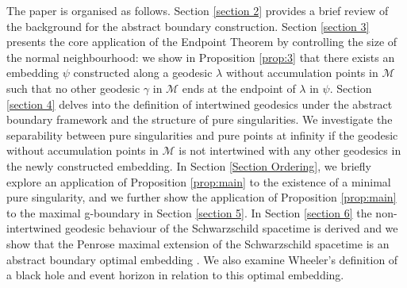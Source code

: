 \documentclass[pdflatex,sn-mathphys-num]{sn-jnl}
\newcommand{\Junbang}[1]{{\color{magenta}#1}}
\theoremstyle{definition}
\begin{document}
The paper is organised as follows. Section \ref{section 2} provides a brief review of the background for the abstract boundary construction. Section \ref{section 3} presents the core application of the Endpoint Theorem by controlling the size of the normal neighbourhood: we show in Proposition \ref{prop:3} that there exists an embedding $\psi$ constructed along a geodesic $\lambda$ without accumulation points in $\mathcal{M}$ such that no other geodesic $\gamma$ in $\mathcal{M}$ ends at the endpoint of $\lambda$ in $\psi$. Section \ref{section 4} delves into the definition of intertwined geodesics under the abstract boundary framework and the structure of pure singularities. We investigate the separability between pure singularities and pure points at infinity if the geodesic without accumulation points in $\mathcal{M}$ is not intertwined with any other geodesics in the newly constructed embedding. In Section \ref{Section Ordering}, we briefly explore an application of Proposition \ref{prop:main} to the existence of a minimal pure singularity, and we further show the application of Proposition \ref{prop:main} to the maximal g-boundary in Section \ref{section 5}. In Section \ref{section 6} the non-intertwined geodesic behaviour of the Schwarzschild spacetime is derived and we show that the Penrose maximal extension of the Schwarzschild spacetime is an abstract boundary optimal embedding \cite{Barry_2014,Barrythesis_2014}. We also examine Wheeler's definition of a black hole and event horizon \cite{Wheeler_2023} in relation to this optimal embedding.\\



\end{document}
